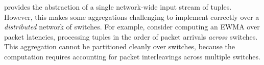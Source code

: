 



 \TheSystem provides the abstraction
of a single network-wide input stream of tuples. However, this makes some
aggregations challenging to implement correctly over a {\em distributed} network
of switches. For example, consider computing an EWMA over packet latencies,
processing tuples in the order of packet arrivals {\em across} switches. This
aggregation cannot be partitioned cleanly over switches, because the
computation requires accounting for packet interleavings across multiple
switches.

